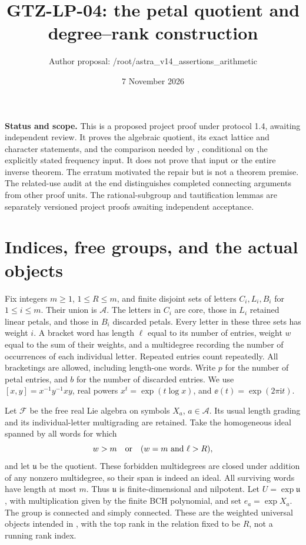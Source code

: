 \documentclass[11pt]{article}
\title{GTZ-LP-04: the petal quotient and degree--rank construction}
\author{Author proposal: /root/astra\_v14\_assertions\_arithmetic}
\date{7 November 2026}
\newcommand{\lie}{\mathfrak u}\newcommand{\id}{\mathrm{id}}
\begin{document}
\maketitle
\noindent\textbf{Status and scope.} This is a proposed project proof under
protocol 1.4, awaiting independent review. It proves the algebraic quotient,
its exact lattice and character statements, and the comparison needed by
\cite[Lemma 12.1]{GTZ}, conditional on the explicitly stated frequency input.
It does not prove that input or the entire inverse theorem. The erratum
\cite{Err} motivated the repair but is not a theorem premise. The related-use
audit at the end distinguishes completed connecting arguments from other
proof units. The rational-subgroup and tautification lemmas \cite{LP13,TAUT}
are separately versioned project proofs awaiting independent acceptance.

\section{Indices, free groups, and the actual objects}
Fix integers $m\geq1$, $1\leq R\leq m$, and finite disjoint sets of letters
$C_i,L_i,B_i$ for $1\leq i\leq m$. Their union is $\mathcal A$.
The letters in $C_i$ are core, those in $L_i$ retained linear petals, and
those in $B_i$ discarded petals. Every letter in these three sets has weight
$i$. A bracket word has length $\ell$ equal to its number of entries, weight
$w$ equal to the sum of their weights, and a multidegree recording the number
of occurrences of each individual letter. Repeated entries count repeatedly.
All bracketings are allowed, including length-one words. Write $p$ for the
number of petal entries, and $b$ for the number of discarded entries.
We use $[x,y]=x^{-1}y^{-1}xy$, real powers
$x^t=\exp(t\log x)$, and $\ee(t)=\exp(2\pi\mathrm i t)$.

Let $\mathcal F$ be the free real Lie algebra on symbols $X_a$, $a\in\mathcal A$.
Its usual length grading and its individual-letter multigrading are retained.
Take the homogeneous ideal spanned by all words for which
\begin{equation}\label{eq:truncate}
 w>m\quad\hbox{or}\quad(w=m\hbox{ and }\ell>R),
\end{equation}
and let $\lie$ be the quotient. These forbidden multidegrees are closed under
addition of any nonzero multidegree, so their span is indeed an ideal.
All surviving words have length at most $m$. Thus $\lie$ is finite-dimensional
and nilpotent. Let $U=\exp\lie$, with multiplication given by the finite BCH
polynomial, and set $e_a=\exp X_a$. The group is connected and simply connected.
These are the weighted universal objects intended in
\cite[Definition 9.1, p.~1279]{GTZ}, with the top rank in the relation fixed
to be $R$, not a running rank index.
\end{document}
